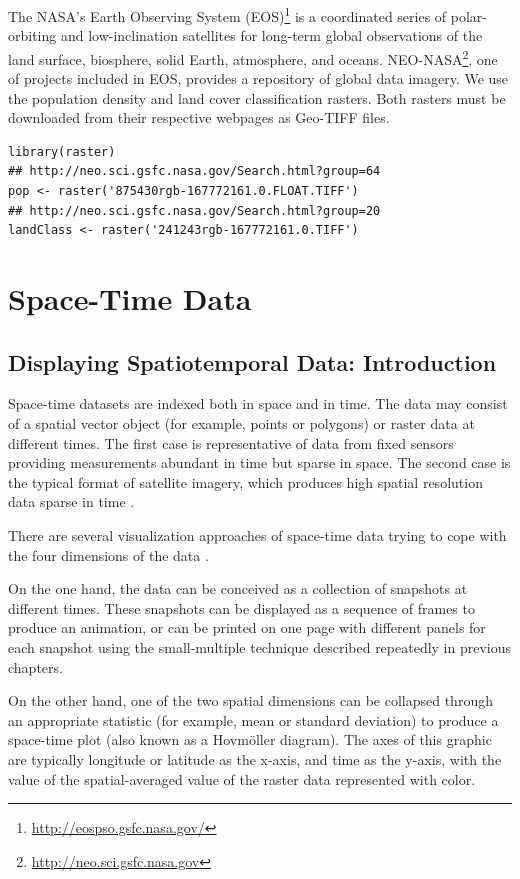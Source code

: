 \documentclass[smallroyalvopaper]{memoir}
\begin{document}
The NASA's Earth Observing System (EOS)\footnote{\url{http://eospso.gsfc.nasa.gov/}} is a coordinated
series of polar-orbiting and low-inclination satellites for
long-term global observations of the land surface, biosphere, solid
Earth, atmosphere, and oceans. NEO-NASA\footnote{\url{http://neo.sci.gsfc.nasa.gov}}, one of projects
included in EOS, provides a repository of global data imagery. We
use the population density and land cover classification
rasters. Both rasters must be downloaded from their respective
webpages as Geo-TIFF files.

\lstset{language=R,numbers=none}
\begin{lstlisting}
library(raster)
## http://neo.sci.gsfc.nasa.gov/Search.html?group=64
pop <- raster('875430rgb-167772161.0.FLOAT.TIFF')
## http://neo.sci.gsfc.nasa.gov/Search.html?group=20
landClass <- raster('241243rgb-167772161.0.TIFF')
\end{lstlisting}

\part{Space-Time Data}
\label{sec:orgb4c0e70}

\chapter{Displaying Spatiotemporal Data: Introduction}
\label{sec:orgd0563ed}
\label{cha:introductionST}

Space-time datasets are indexed both in space and in time. The data may consist of a spatial vector object (for example, points or polygons) or raster data at different times. The first case is representative of data from fixed sensors providing measurements abundant in time but sparse in space. The second case is the typical format of satellite imagery, which produces high spatial resolution data sparse in time \cite{Pebesma2012}.

There are several visualization approaches of space-time data trying to cope with the four dimensions of the data \cite{Cressie.Wikle2011}.

On the one hand, the data can be conceived as a collection of snapshots at different times. These snapshots can be displayed as a sequence of frames to produce an animation, or can be printed on one page with different panels for each snapshot using the small-multiple technique described repeatedly in previous chapters.

On the other hand, one of the two spatial dimensions can be collapsed through an appropriate statistic (for example, mean or standard deviation) to produce a space-time plot (also known as a Hovmöller diagram). The axes of this graphic are typically longitude or latitude as the x-axis, and time as the y-axis, with the value of the spatial-averaged value of the raster data represented with color.
\end{document}
